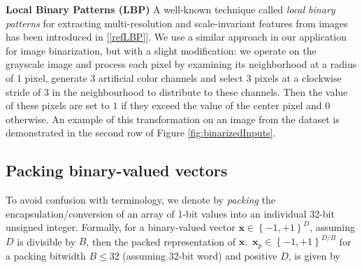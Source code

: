 \documentclass[conference,compsoc]{IEEEtran}
\newcommand{\jani}[1]{\textcolor{red}{\textbf{[Jani: #1]}}}
\newcommand{\response}[1]{\textcolor{darkgreen}{#1}}
\begin{document}
\textbf{Local Binary Patterns (LBP)}
A well-known technique called \textit{local binary patterns} for extracting multi-resolution and scale-invariant features from images has been introduced in [\ref{refLBP}]. We use a similar approach in our application for image binarization, but with a slight modification: we operate on the grayscale image and process each pixel by examining its neighborhood at a radius of 1 pixel, generate 3 artificial color channels and select 3 pixels at a clockwise stride of $3$ in the neighbourhood to distribute to these channels. Then the value of these pixels are set to $1$ if they exceed the value of the center pixel and $0$ otherwise. An example of this transformation on an image from the dataset is demonstrated in the second row of Figure \ref{fig:binarizedInputs}.

\subsection{Packing binary-valued vectors}
To avoid confusion with terminology, we denote by \textit{packing} the encapsulation/conversion of an array of 1-bit values into an individual 32-bit unsigned integer. Formally, for a binary-valued vector $\mathbf{x}\in \left\lbrace-1,+1\right\rbrace ^{D}$, assuming $D$ is divisible by $B$, then the packed representation of $\mathbf{x},$ $\mathbf{x}_p\in \left\lbrace-1,+1\right\rbrace ^{D/B}$
for a packing bitwidth $B\leq32$ (assuming 32-bit word) and positive $D$, is given by 
\end{document}
